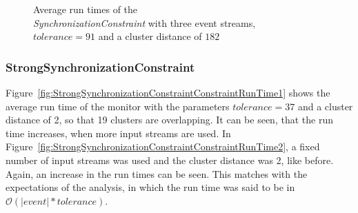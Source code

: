 \begin{figure}
\begin{minipage}{0.45\textwidth}
		\centering
		\caption{Average run times of the\\ \textit{SynchronizationConstraint} with three event streams,\\ $tolerance=91$ and a cluster distance of $182$ }
		\label{fig:SynchronizationConstraintConstraintRunTime2}
	\end{minipage}
\end{figure}


\subsubsection{StrongSynchronizationConstraint}
	Figure~\ref{fig:StrongSynchronizationConstraintConstraintRunTime1} shows the average run time of the monitor with the parameters $tolerance = 37$ and a cluster distance of 2, so that 19 clusters are overlapping. It can be seen, that the run time increases, when more input streams are used. In Figure~\ref{fig:StrongSynchronizationConstraintConstraintRunTime2}, a fixed number of input streams was used and the cluster distance was 2, like before. Again, an increase in the run times can be seen. This matches with the expectations of the analysis, in which the run time was said to be in $\mathcal{O}(|event| * tolerance)$.

